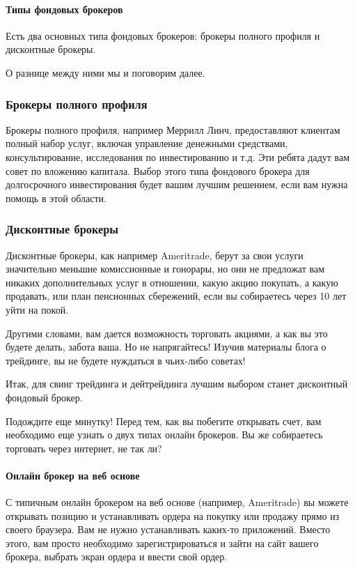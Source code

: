 \documentclass{book}
\begin{document}
\paragraph{Типы фондовых брокеров}

Есть два основных типа фондовых брокеров: брокеры полного профиля и дисконтные брокеры.

О разнице между ними мы и поговорим далее.

\subsubsection{Брокеры полного профиля}

Брокеры полного профиля, например Меррилл Линч, предоставляют клиентам
полный набор услуг, включая управление денежными средствами,
консультирование, исследования по инвестированию и т.д. Эти ребята
дадут вам совет по вложению капитала. Выбор этого типа фондового
брокера для долгосрочного инвестирования будет вашим лучшим решением,
если вам нужна помощь в этой области.

\subsubsection{Дисконтные брокеры}

Дисконтные брокеры, как например Ameritrade, берут за свои услуги значительно меньшие комиссионные и гонорары, но они не предложат вам никаких дополнительных услуг в отношении, какую акцию покупать, а какую продавать, или план пенсионных сбережений, если вы собираетесь через 10 лет уйти на покой.

Другими словами, вам дается возможность торговать акциями, а как вы это будете делать, забота ваша. Но не напрягайтесь! Изучив материалы блога о трейдинге, вы не будете нуждаться в чьих-либо советах!

Итак, для свинг трейдинга и дейтрейдинга лучшим выбором станет дисконтный фондовый брокер.

Подождите еще минутку! Перед тем, как вы побегите открывать счет, вам
необходимо еще узнать о двух типах онлайн брокеров. Вы же собираетесь
торговать через интернет, не так ли?

\paragraph{Онлайн брокер на веб основе}

С типичным онлайн брокером на веб основе (например, Ameritrade) вы можете открывать позицию и устанавливать ордера на покупку или продажу прямо из своего браузера. Вам не нужно устанавливать каких-то приложений. Вместо этого, вам просто необходимо зарегистрироваться и зайти на сайт вашего брокера, выбрать экран ордера и ввести свой ордер.
\end{document}
